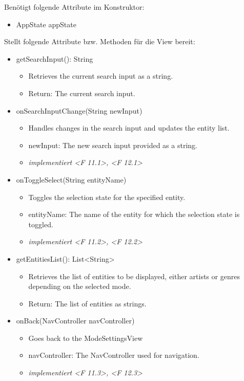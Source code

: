 \documentclass[oneside, ngerman]{sdqtechreport}
\begin{document}
Benötigt folgende Attribute im Konstruktor:
\begin{itemize}
    \item AppState appState
\end{itemize}
Stellt folgende Attribute bzw. Methoden für die View bereit:
\begin{itemize}
    \item getSearchInput(): String
        \begin{itemize}
            \item Retrieves the current search input as a string.
            \item Return: The current search input.
        \end{itemize}
    \item onSearchInputChange(String newInput)
        \begin{itemize}
            \item Handles changes in the search input and updates the entity list.
            \item newInput: The new search input provided as a string.
            \item \textit{implementiert <F 11.1>, <F 12.1>}
        \end{itemize}
    \item onToggleSelect(String entityName)
        \begin{itemize}
            \item Toggles the selection state for the specified entity.
            \item entityName: The name of the entity for which the selection state is toggled.
            \item \textit{implementiert <F 11.2>, <F 12.2>}
        \end{itemize}
    \item getEntitiesList(): List<String>
        \begin{itemize}
            \item Retrieves the list of entities to be displayed, either artists or genres depending on the selected mode.
            \item Return: The list of entities as strings.
        \end{itemize}
    \item onBack(NavController navController)
        \begin{itemize}
            \item Goes back to the ModeSettingsView
            \item navController: The NavController used for navigation.
            \item \textit{implementiert <F 11.3>, <F 12.3>}
        \end{itemize}
\end{itemize}
\end{document}
